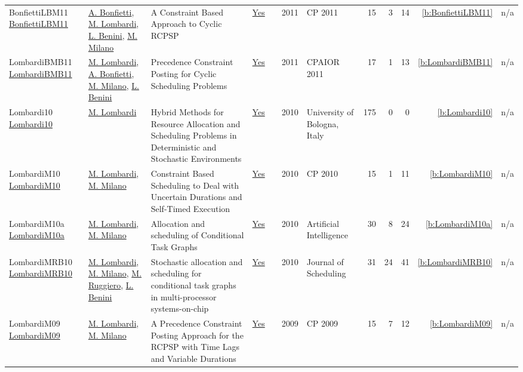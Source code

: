 {\begin{longtable}{>{\raggedright\arraybackslash}p{3cm}>{\raggedright\arraybackslash}p{6cm}>{\raggedright\arraybackslash}p{6.5cm}rrrp{2.5cm}rrrrr}
BonfiettiLBM11 \href{https://doi.org/10.1007/978-3-642-23786-7_12}{BonfiettiLBM11} & \hyperref[auth:a203]{A. Bonfietti}, \hyperref[auth:a143]{M. Lombardi}, \hyperref[auth:a247]{L. Benini}, \hyperref[auth:a144]{M. Milano} & A Constraint Based Approach to Cyclic {RCPSP} & \href{../works/BonfiettiLBM11.pdf}{Yes} & \cite{BonfiettiLBM11} & 2011 & CP 2011 & 15 & 3 & 14 & \ref{b:BonfiettiLBM11} & n/a\\
LombardiBMB11 \href{https://doi.org/10.1007/978-3-642-21311-3_14}{LombardiBMB11} & \hyperref[auth:a143]{M. Lombardi}, \hyperref[auth:a203]{A. Bonfietti}, \hyperref[auth:a144]{M. Milano}, \hyperref[auth:a247]{L. Benini} & Precedence Constraint Posting for Cyclic Scheduling Problems & \href{../works/LombardiBMB11.pdf}{Yes} & \cite{LombardiBMB11} & 2011 & CPAIOR 2011 & 17 & 1 & 13 & \ref{b:LombardiBMB11} & n/a\\
Lombardi10 \href{http://amsdottorato.unibo.it/2961/}{Lombardi10} & \hyperref[auth:a143]{M. Lombardi} & Hybrid Methods for Resource Allocation and Scheduling Problems in Deterministic and Stochastic Environments & \href{../works/Lombardi10.pdf}{Yes} & \cite{Lombardi10} & 2010 & University of Bologna, Italy & 175 & 0 & 0 & \ref{b:Lombardi10} & n/a\\
LombardiM10 \href{https://doi.org/10.1007/978-3-642-15396-9_32}{LombardiM10} & \hyperref[auth:a143]{M. Lombardi}, \hyperref[auth:a144]{M. Milano} & Constraint Based Scheduling to Deal with Uncertain Durations and Self-Timed Execution & \href{../works/LombardiM10.pdf}{Yes} & \cite{LombardiM10} & 2010 & CP 2010 & 15 & 1 & 11 & \ref{b:LombardiM10} & n/a\\
LombardiM10a \href{https://doi.org/10.1016/j.artint.2010.02.004}{LombardiM10a} & \hyperref[auth:a143]{M. Lombardi}, \hyperref[auth:a144]{M. Milano} & Allocation and scheduling of Conditional Task Graphs & \href{../works/LombardiM10a.pdf}{Yes} & \cite{LombardiM10a} & 2010 & Artificial Intelligence & 30 & 8 & 24 & \ref{b:LombardiM10a} & n/a\\
LombardiMRB10 \href{http://dx.doi.org/10.1007/s10951-010-0184-y}{LombardiMRB10} & \hyperref[auth:a143]{M. Lombardi}, \hyperref[auth:a144]{M. Milano}, \hyperref[auth:a724]{M. Ruggiero}, \hyperref[auth:a247]{L. Benini} & Stochastic allocation and scheduling for conditional task graphs in multi-processor systems-on-chip & \href{../works/LombardiMRB10.pdf}{Yes} & \cite{LombardiMRB10} & 2010 & Journal of Scheduling & 31 & 24 & 41 & \ref{b:LombardiMRB10} & n/a\\
LombardiM09 \href{https://doi.org/10.1007/978-3-642-04244-7_45}{LombardiM09} & \hyperref[auth:a143]{M. Lombardi}, \hyperref[auth:a144]{M. Milano} & A Precedence Constraint Posting Approach for the {RCPSP} with Time Lags and Variable Durations & \href{../works/LombardiM09.pdf}{Yes} & \cite{LombardiM09} & 2009 & CP 2009 & 15 & 7 & 12 & \ref{b:LombardiM09} & n/a\\

\end{longtable}}
